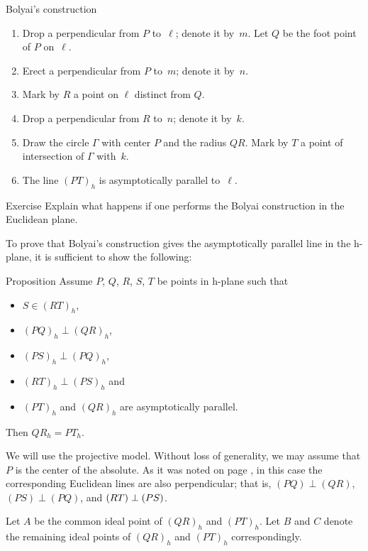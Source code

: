 \begin{thm}{Bolyai's construction}
\begin{enumerate}
\item Drop a perpendicular from $P$ to~$\ell$; denote it by~$m$.
Let $Q$ be the foot point of $P$ on~$\ell$.
\item Erect a perpendicular from $P$ to~$m$; denote it by~$n$.
\item Mark by $R$ a point on $\ell$ distinct from $Q$.
\item Drop a perpendicular from $R$ to~$n$; denote it by~$k$. 
\item Draw the circle $\Gamma$ with center $P$ and the radius $QR$. 
Mark by $T$ a point of intersection of $\Gamma$ with~$k$.
\item The line $(PT)_h$ is asymptotically parallel to~$\ell$.
\end{enumerate}
\end{thm}

\begin{thm}{Exercise}\label{ex:Boyai-in-Euclid}
Explain what happens if one performs the Bolyai construction in the Euclidean plane.
\end{thm}

To prove that Bolyai's construction gives the asymptotically parallel line in the h-plane,
it is sufficient to show the following:

\begin{thm}{Proposition}\label{prop:boyai}
Assume $P$, $Q$, $R$, $S$, $T$ be points in h-plane
such that 
\begin{itemize}
\item $S\in (RT)_h$,
\item $(PQ)_h\perp (QR)_h$,
\item $(PS)_h\perp(PQ)_h$,
\item $(RT)_h\perp (PS)_h$ and 
\item $(PT)_h$ and $(QR)_h$ are asymptotically parallel.
\end{itemize}
Then $QR_h=PT_h$.
\end{thm}


We will use the projective model.
Without loss of generality, we may assume that $P$ is the center of the absolute.
As it was noted on page \pageref{klein-angles},
in this case the corresponding Euclidean lines are also perpendicular;
that is, $(PQ)\perp (QR)$, $(PS)\perp(PQ)$, and $(RT)\z\perp (PS)$.

Let $A$ be the common ideal point of $(QR)_h$ and $(PT)_h$.
Let $B$ and $C$ denote the remaining ideal points of $(QR)_h$ and $(PT)_h$
correspondingly.

